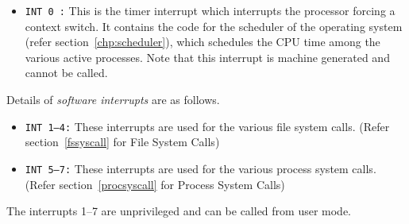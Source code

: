 \begin{itemize}
	\item \texttt{INT 0 :} This is the timer interrupt  which interrupts the processor forcing a context switch. It contains the code for the scheduler of the operating system (refer section~\ref{chp:scheduler}), which schedules the CPU time among the various active processes. Note that this interrupt is machine generated and cannot be called.
\end{itemize}

Details of \emph{software interrupts} are as follows.
\begin{itemize}
	\item \texttt{INT 1--4:} These interrupts are used for the various file system calls. (Refer section~\ref{fssyscall} for File System Calls)
	\item \texttt{INT 5--7:} These interrupts are used for the various process system calls. (Refer section~\ref{procsyscall} for Process System Calls)
\end{itemize}
The interrupts 1--7  are unprivileged and can be called from user mode.


